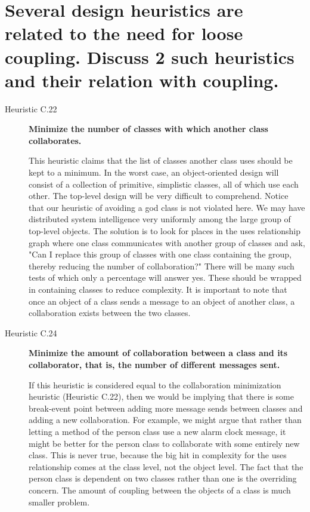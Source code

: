 \section{Several design heuristics are related to the need for loose coupling. Discuss 2 such heuristics and their relation with coupling.}

\begin{description}
\item[Heuristic C.22] \textbf{Minimize the number of classes with which another class collaborates.}


This heuristic claims that the list of classes another class uses should be kept to a minimum. In the worst case, an object-oriented design will consist of a collection of primitive, simplistic classes, all of which use each other. The top-level design will be very difficult to comprehend. Notice that our heuristic of avoiding a god class is not violated here. We may have distributed system intelligence very uniformly among the large group of top-level objects. The solution is to look for places in the uses relationship graph where one class communicates with another group of classes and ask, "Can I replace this group of classes with one class containing the group, thereby reducing the number of collaboration?" There will be many such tests of which only a percentage will answer yes. These should be wrapped in containing classes to reduce complexity.
It is important to note that once an object of a class sends a message to an object of another class, a collaboration exists between the two classes.

\item[Heuristic C.24] \textbf{ Minimize the amount of collaboration between a class
and its collaborator, that is, the number of different messages sent.}

If this heuristic is considered equal to the collaboration minimization heuristic (Heuristic C.22), then we would be implying that there is some break-event point between adding more message sends between classes and adding a new collaboration. For example, we might argue that rather than letting a method of the person class use a new alarm clock message, it might be better for the person class to collaborate with some entirely new class. This is never true, because the big hit in complexity for the uses relationship comes at the class level, not the object level. The fact that the person class is dependent on two classes rather than one is the overriding concern. The amount of coupling between the objects of a class is much smaller problem.

\end{description}

